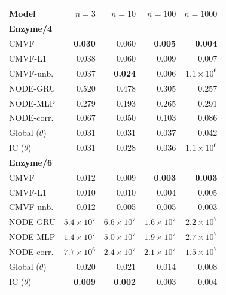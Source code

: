 \begin{tabular*}{\linewidth}{@{\extracolsep{\fill}}lrrrr}
\toprule
Model & $n=3$ & $n=10$ & $n=100$ & $n=1000$ \\
\midrule
\multicolumn{5}{l}{\textbf{Enzyme/4}} \\
CMVF & \textbf{0.030} & 0.060 & \textbf{0.005} & \textbf{0.004} \\
CMVF-L1 & 0.038 & 0.060 & 0.009 & 0.007 \\
CMVF-unb. & 0.037 & \textbf{0.024} & 0.006 & $1.1\!\times\!10^{6}$ \\
NODE-GRU & 0.520 & 0.478 & 0.305 & 0.257 \\
NODE-MLP & 0.279 & 0.193 & 0.265 & 0.291 \\
NODE-corr. & 0.067 & 0.050 & 0.103 & 0.086 \\
Global ($\theta$) & 0.031 & 0.031 & 0.037 & 0.042 \\
IC ($\theta$) & 0.031 & 0.028 & 0.036 & $1.1\!\times\!10^{6}$ \\
\midrule
\multicolumn{5}{l}{\textbf{Enzyme/6}} \\
CMVF & 0.012 & 0.009 & \textbf{0.003} & \textbf{0.003} \\
CMVF-L1 & 0.010 & 0.010 & 0.004 & 0.005 \\
CMVF-unb. & 0.012 & 0.005 & 0.005 & 0.003 \\
NODE-GRU & $5.4\!\times\!10^{7}$ & $6.6\!\times\!10^{7}$ & $1.6\!\times\!10^{7}$ & $2.2\!\times\!10^{7}$ \\
NODE-MLP & $1.4\!\times\!10^{7}$ & $5.0\!\times\!10^{7}$ & $1.9\!\times\!10^{7}$ & $2.7\!\times\!10^{7}$ \\
NODE-corr. & $7.7\!\times\!10^{6}$ & $2.4\!\times\!10^{7}$ & $2.1\!\times\!10^{7}$ & $1.5\!\times\!10^{7}$ \\
Global ($\theta$) & 0.020 & 0.021 & 0.014 & 0.008 \\
IC ($\theta$) & \textbf{0.009} & \textbf{0.002} & 0.003 & 0.004 \\
\bottomrule
\end{tabular*}
